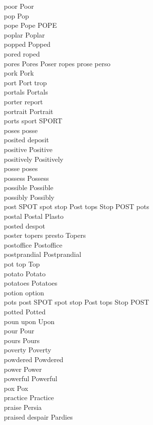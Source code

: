 poor Poor\\
pop Pop\\
pope Pope POPE\\
poplar Poplar\\
popped Popped\\
pored roped\\
pores Pores Poser ropes prose perso\\
pork Pork\\
port Port trop\\
portals Portals\\
porter report\\
portrait Portrait\\
ports sport SPORT\\
poses posse\\
posited deposit\\
positive Positive\\
positively Positively\\
posse poses\\
possess Possess\\
possible Possible\\
possibly Possibly\\
post SPOT spot stop Post tops Stop POST pots\\
postal Postal Plasto\\
posted despot\\
poster topers presto Topers\\
postoffice Postoffice\\
postprandial Postprandial\\
pot top Top\\
potato Potato\\
potatoes Potatoes\\
potion option\\
pots post SPOT spot stop Post tops Stop POST\\
potted Potted\\
poun upon Upon\\
pour Pour\\
pours Pours\\
poverty Poverty\\
powdered Powdered\\
power Power\\
powerful Powerful\\
pox Pox\\
practice Practice\\
praise Persia\\
praised despair Pardies\\
